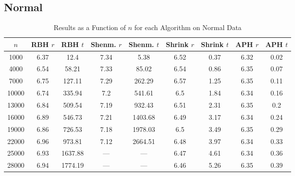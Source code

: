 \documentclass[11pt,twoside]{report}
\theoremstyle{definition}
\numberwithin{theorem}{section}
\numberwithin{definition}{section}
\numberwithin{lemma}{section}
\numberwithin{proposition}{section}
\numberwithin{equation}{section}
\numberwithin{figure}{section}
\begin{document}
\begin{appendices}
    \subsection{Normal}
    \begin{table}[ht]
        \centering
        \begin{tabular}{|c||c|c||c|c||c|c||c|c|}\hline
            $n$&RBH $r$&RBH $t$&Shenm. $r$&Shenm. $t$&Shrink $r$&Shrink $t$&APH $r$&APH $t$ \\ \hline
            1000&6.37&12.4&7.34&5.38&6.52&0.37&6.32&0.02 \\
            4000&6.54&58.21&7.33&85.02&6.54&0.86&6.35&0.07 \\
            7000&6.75&127.11&7.29&262.29&6.57&1.25&6.35&0.11 \\
            10000&6.74&335.94&7.2&541.61&6.5&1.84&6.34&0.16 \\
            13000&6.84&509.54&7.19&932.43&6.51&2.31&6.35&0.2 \\
            16000&6.89&546.73&7.21&1403.68&6.49&3.17&6.34&0.24 \\
            19000&6.86&726.53&7.18&1978.03&6.5&3.49&6.35&0.29 \\
            22000&6.96&973.81&7.12&2664.51&6.48&3.97&6.34&0.33 \\
            25000&6.93&1637.88&---&---&6.47&4.61&6.34&0.36 \\
            28000&6.94&1774.19&---&---&6.46&5.26&6.35&0.39 \\ \hline
        \end{tabular}
        \caption{Results as a Function of $n$ for each Algorithm on Normal Data}
        \label{tab:normal_table_n}
    \end{table}
    

\end{appendices}
\end{document}
